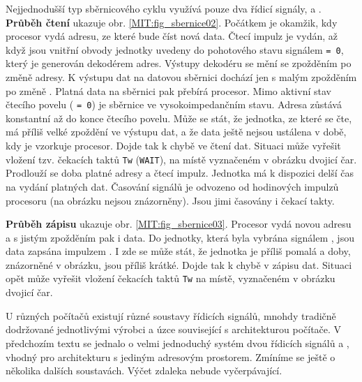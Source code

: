       Nejjednodušší typ sběrnicového cyklu využívá pouze dva řídicí signály, 
       a . \textbf{Průběh čtení} ukazuje obr. 
      \ref{MIT:fig_sbernice02}. Počátkem je okamžik, kdy procesor vydá adresu, ze které bude číst 
      nová data. Čtecí impulz  je vydán, až když jsou vnitřní obvody 
      jednotky uvedeny do pohotového stavu signálem   \texttt{= 0}, který 
      je generován dekodérem adres. Výstupy dekodéru se mění se zpožděním po změně adresy. K 
      výstupu dat na datovou sběrnici dochází jen s malým zpožděním po změně 
      . Platná data na sběrnici pak přebírá procesor. Mimo aktivní stav 
      čtecího povelu ( \texttt{= 0}) je sběrnice ve vysokoimpedančním 
      stavu. Adresa zůstává konstantní až do konce čtecího povelu. Může se stát, že jednotka, ze 
      které se čte, má příliš velké zpoždění ve výstupu dat, a že data ještě nejsou ustálena v 
      době, kdy je vzorkuje procesor. Dojde tak k chybě ve čtení dat. Situaci může vyřešit vložení 
      tzv. čekacích taktů \texttt{Tw} (\texttt{WAIT}), na místě vyznačeném v obrázku dvojicí čar. 
      Prodlouží se doba platné adresy a čtecí impulz. Jednotka má k dispozici delší čas na vydání 
      platných dat. Časování signálů je odvozeno od hodinových impulzů procesoru (na obrázku nejsou 
      znázorněny). Jsou jimi časovány i čekací takty.
      
      \textbf{Průběh zápisu} ukazuje obr. \ref{MIT:fig_sbernice03}. Procesor vydá novou adresu a s 
      jistým zpožděním pak i data. Do jednotky, která byla vybrána signálem  
      , jsou data zapsána impulzem . I zde se 
      může stát, že jednotka je příliš pomalá a doby, znázorněné v obrázku, jsou příliš krátké. 
      Dojde tak k chybě v zápisu dat. Situaci opět může vyřešit vložení čekacích taktů \texttt{Tw} 
      na místě, vyznačeném v obrázku dvojicí čar.
     
      U různých počítačů existují různé soustavy řídicích signálů, mnohdy tradičně dodržované 
      jednotlivými výrobci a úzce související s architekturou počítače. V předchozím textu se 
      jednalo o velmi jednoduchý systém dvou řídicích signálů  a 
      , vhodný pro architekturu s jediným adresovým prostorem. Zmíníme se 
      ještě o několika dalších soustavách. Výčet zdaleka nebude vyčerpávající.
      
